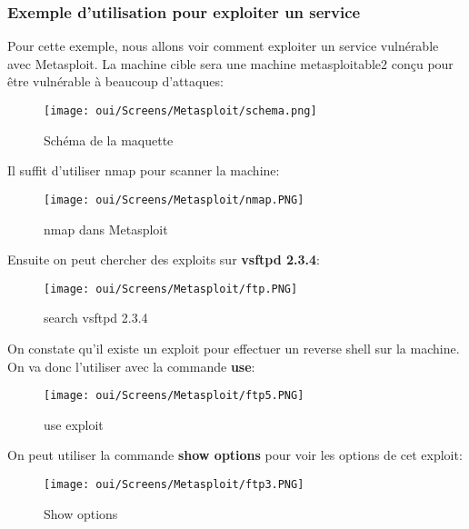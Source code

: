 \subsubsection{Exemple d'utilisation pour exploiter un service}

Pour cette exemple, nous allons voir comment exploiter un service vulnérable avec Metasploit. La machine cible sera une machine metasploitable2 conçu pour être vulnérable à beaucoup d'attaques:

\begin{figure}[htp!]
  \centering
  \setlength\figureheight{7cm}
  \setlength\figurewidth{9cm}
  \texttt{[image: oui/Screens/Metasploit/schema.png]}
  \caption{Schéma de la maquette}
  \label{fig:courbe-tikz}
\end{figure}

Il suffit d'utiliser nmap pour scanner la machine:
\begin{figure}[htp!]
  \centering
  \setlength\figureheight{7cm}
  \setlength\figurewidth{9cm}
  \texttt{[image: oui/Screens/Metasploit/nmap.PNG]}
  \caption{nmap dans Metasploit}
  \label{fig:courbe-tikz}
\end{figure}

Ensuite on peut chercher des exploits sur \textbf{vsftpd 2.3.4}:
\begin{figure}[htp!]
  \centering
  \setlength\figureheight{7cm}
  \setlength\figurewidth{9cm}
  \texttt{[image: oui/Screens/Metasploit/ftp.PNG]}
  \caption{search vsftpd 2.3.4}
  \label{fig:courbe-tikz}
\end{figure}

\newpage
On constate qu'il existe un exploit pour effectuer un reverse shell sur la machine. On va donc l'utiliser avec la commande \textbf{use}:

\begin{figure}[htp!]
  \centering
  \setlength\figureheight{7cm}
  \setlength\figurewidth{9cm}
  \texttt{[image: oui/Screens/Metasploit/ftp5.PNG]}
  \caption{use exploit}
  \label{fig:courbe-tikz}
\end{figure}

\noindent On peut utiliser la commande \textbf{show options} pour voir les options de cet exploit:

\begin{figure}[htp!]
  \centering
  \setlength\figureheight{7cm}
  \setlength\figurewidth{9cm}
  \texttt{[image: oui/Screens/Metasploit/ftp3.PNG]}
  \caption{Show options}
  \label{fig:courbe-tikz}
\end{figure}

